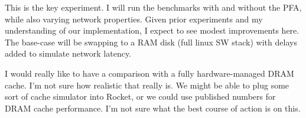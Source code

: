 This is the key experiment. I will run the benchmarks with and without the PFA, while also varying network properties. Given prior experiments and my understanding of our implementation, I expect to see modest improvements here. The base-case will be swapping to a RAM disk (full linux SW stack) with delays added to simulate network latency.

I would really like to have a comparison with a fully hardware-managed DRAM cache. I'm not sure how realistic that really is. We might be able to plug some sort of cache simulator into Rocket, or we could use published numbers for DRAM cache performance. I'm not sure what the best course of action is on this.